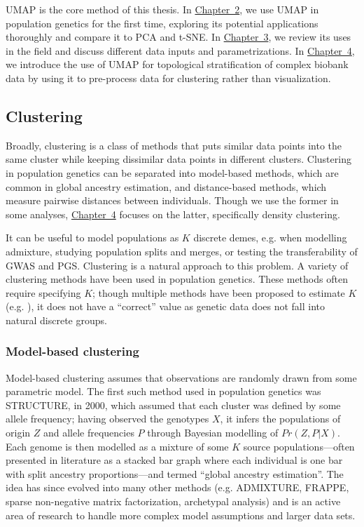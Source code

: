 UMAP is the core method of this thesis. In \hyperref[chap:chapter2]{Chapter~2}, we use UMAP in population genetics for the first time, exploring its potential applications thoroughly and compare it to PCA and t-SNE. In \hyperref[chap:chapter3]{Chapter~3}, we review its uses in the field and discuss different data inputs and parametrizations. In \hyperref[chap:chapter4]{Chapter~4}, we introduce the use of UMAP for topological stratification of complex biobank data by using it to pre-process data for clustering rather than visualization.

\subsection{Clustering}

Broadly, clustering is a class of methods that puts similar data points into the same cluster while keeping dissimilar data points in different clusters\citep{ben-david_clustering_2018}. Clustering in population genetics can be separated into model-based methods, which are common in global ancestry estimation, and distance-based methods, which measure pairwise distances between individuals. Though we use the former in some analyses, \hyperref[chap:chapter4]{Chapter~4} focuses on the latter, specifically density clustering.

It can be useful to model populations as $K$ discrete demes, e.g. when modelling admixture, studying population splits and merges, or testing the transferability of GWAS and PGS. Clustering is a natural approach to this problem. A variety of clustering methods have been used in population genetics. These methods often require specifying $K$; though multiple methods have been proposed to estimate $K$ (e.g. \citep{evanno_detecting_2005,verity_estimating_2016}), it does not have a ``correct'' value as genetic data does not fall into natural discrete groups\citep{lawson_tutorial_2018}.

\subsubsection{Model-based clustering}

Model-based clustering assumes that observations are randomly drawn from some parametric model. The first such method used in population genetics was STRUCTURE, in 2000, which assumed that each cluster was defined by some allele frequency; having observed the genotypes $X$, it infers the populations of origin $Z$ and allele frequencies $P$ through Bayesian modelling of $Pr(Z, P|X)$\citep{pritchard_inference_2000}. Each genome is then modelled as a mixture of some $K$ source populations---often presented in literature as a stacked bar graph where each individual is one bar with split ancestry proportions---and termed ``global ancestry estimation''\citep{alexander_fast_2009}. The idea has since evolved into many other methods (e.g. ADMIXTURE\citep{alexander_fast_2009}, FRAPPE\citep{tang_estimation_2005}, sparse non-negative matrix factorization\citep{frichot_fast_2014}, archetypal analysis\citep{gimbernat-mayol_archetypal_2022}) and is an active area of research to handle more complex model assumptions and larger data sets.

